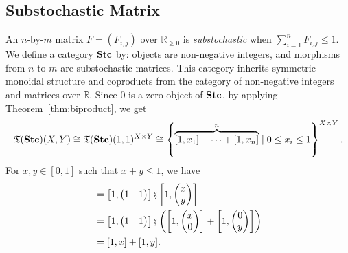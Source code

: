 \subsection{Substochastic Matrix}

An $n$-by-$m$ matrix $F=(F_{i,j})$ over $\mathbb{R}_{\geq 0}$ is
\emph{substochastic} when $\sum_{i=1}^{n}F_{i,j} \leq 1$. We define
a category $\mathbf{Stc}$ by: objects are non-negative integers, and
morphisms from $n$ to $m$ are substochastic matrices.
This category inherits symmetric monoidal structure
and coproducts from the category of non-negative integers
and matrices over $\mathbb{R}$. Since $0$ is a zero object
of $\mathbf{Stc}$, by applying Theorem~\ref{thm:biproduct}, we get
\begin{equation*}
  \mathfrak{T}(\mathbf{Stc})(X,Y) \cong
  \mathfrak{T}(\mathbf{Stc})(1,1)^{X \times Y}
  \cong \left\{\overbrace{[1,x_{1}] + \cdots + [1,x_{n}]}^{n}
    \mid 0 \leq x_{i} \leq 1 \right\}^{X \times Y}.
\end{equation*}
For $x,y \in [0,1]$ such that $x+y \leq 1$, we have
\begin{align*}
  [1,x + y]
  &= \left[1,
    \begin{pmatrix}
      1 & 1 \\
    \end{pmatrix}\right]
  \fatsemi
  \left[1,
  \begin{pmatrix}
    x \\
    y \\
  \end{pmatrix}
  \right] \\
  &= \left[1,
    \begin{pmatrix}
      1 & 1 \\
    \end{pmatrix}\right]
  \fatsemi
  \left(
  \left[1,
  \begin{pmatrix}
    x \\
    0 \\
  \end{pmatrix}
  \right] +
  \left[1,
  \begin{pmatrix}
    0 \\
    y \\
  \end{pmatrix}
  \right]\right)\\
  &= [1,x] + [1,y].
\end{align*}
